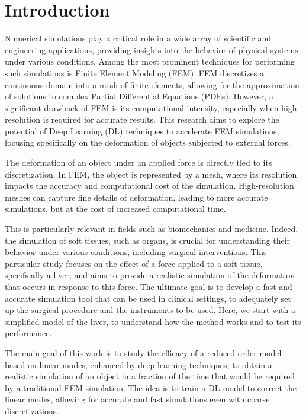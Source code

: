 

\section{Introduction}
Numerical simulations play a critical role in a wide array of scientific and engineering applications, providing insights into the behavior of physical systems under various conditions. Among the most prominent techniques for performing such simulations is Finite Element Modeling (FEM). FEM discretizes a continuous domain into a mesh of finite elements, allowing for the approximation of solutions to complex Partial Differential Equations (PDEs). However, a significant drawback of FEM is its computational intensity, especially when high resolution is required for accurate results. This research aims to explore the potential of Deep Learning (DL) techniques to accelerate FEM simulations, focusing specifically on the deformation of objects subjected to external forces.

The deformation of an object under an applied force is directly tied to its discretization. In FEM, the object is represented by a mesh, where its resolution impacts the accuracy and computational cost of the simulation. High-resolution meshes can capture fine details of deformation, leading to more accurate simulations, but at the cost of increased computational time.

This is particularly relevant in fields such as biomechanics and medicine. Indeed, the simulation of soft tissues, such as organs, is crucial for understanding their behavior under various conditions, including surgical interventions. This particular study focuses on the effect of a force applied to a soft tissue, specifically a liver, and aims to provide a realistic simulation of the deformation that occurs in response to this force. The ultimate goal is to develop a fast and accurate simulation tool that can be used in clinical settings, to adequately set up the surgical procedure and the instruments to be used. Here, we start with a simplified model of the liver, to understand how the method works and to test its performance.

The main goal of this work is to study the efficacy of a reduced order model based on linear modes, enhanced by deep learning techniques, to obtain a realistic simulation of an object in a fraction of the time that would be required by a traditional FEM simulation. The idea is to train a DL model to correct the linear modes, allowing for accurate and fast simulations even with coarse discretizations.

